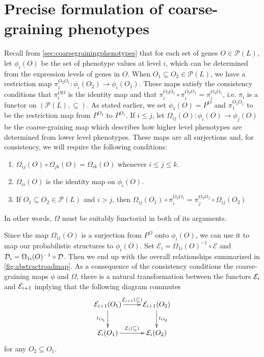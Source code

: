 \section{Precise formulation of coarse-graining phenotypes}\label{secsupp:coarsegrainingphenotypes}

Recall from \ref{sec:coarsegrainingphenotypes} that for each set of genes $O \in \mathcal{P}(L)$, let $\phi_i (O)$ be the set of phenotype values at level $i$, which can be determined from the expression levels of genes in $O$.  When $O_1 \subseteq O_2 \in \mathcal{P}(L)$, we have a restriction map $\pi_i^{O_2 O_1} \colon \phi_i(O_2) \to \phi_i(O_1)$.  These maps satisfy the consistency conditions that $\pi_i^{OO}$ is the identity map and that $\pi_i^{O_3 O_2} \circ \pi_i^{O_2 O_1} = \pi_i^{O_3 O_1}$, i.e. $\pi_i$ is a functor on $(\mathcal{P}(L), \subseteq)$.  As stated earlier, we set $\phi_1 (O) = P^O$ and $\pi_1^{O_2 O_1}$ to be the restriction map from $P^{O_2}$ to $P^{O_1}$.  If $i \le j$, let $\Omega_{ij}(O) : \phi_i(O) \to \phi_j(O)$ be the coarse-graining map which describes how higher level phenotypes are determined from lower level phenotypes.  These maps are all surjections and, for consistency, we will require the following conditions:
\begin{enumerate}
\item $\Omega_{ij}(O) \circ \Omega_{jk}(O) = \Omega_{ik}(O)$ whenever $i \le j \le k$.
\item $\Omega_{ii}(O)$ is the identity map on $\phi_i (O)$.
\item If $O_1 \subseteq O_2 \in \mathcal{P}(L)$ and $i > j$, then $\Omega_{ij}(O_1) \circ \pi_i^{O_2 O_1} = \pi_j^{O_2 O_1} \circ \Omega_{ij}(O_2)$
\end{enumerate}
In other words, $\Omega$ must be suitably functorial in both of its arguments.

Since the map $\Omega_{1i}(O)$ is a surjection from $P^O$ onto $\phi_i(O)$, we can use it to map our probabilistic structures to $\phi_i(O)$.  Set $\mathcal{E}_i = \Omega_{1i}(O)^{-1} \circ \mathcal{E}$ and $\mathcal{D}_i = \Omega_{1i}(O)^{-1} \circ \mathcal{D}$.  Then we end up with the overall relationships summarized in \ref{fig:abstractroadmap}. As a consequence of the consistency conditions the coarse-graining maps $\phi$ and $\Omega$, there is a natural transformation between the functors $\mathcal{E}_i$ and $\mathcal{E}_{i+1}$ implying that the following diagram commutes
$$
\xymatrix{
\expr_{i+1}(O_1) \ar[r]^{\expr_{i+1}(\subseteq)} \ar[d]_{t_{O_1}} & \expr_{i+1}(O_2) \ar[d]^{t_{O_2}} \\
\expr_{i}(O_1) \ar[r]^{\expr_{i}(\subseteq)} & \expr_{i}(O_2) }
$$
for any $O_2 \subseteq O_1$.

